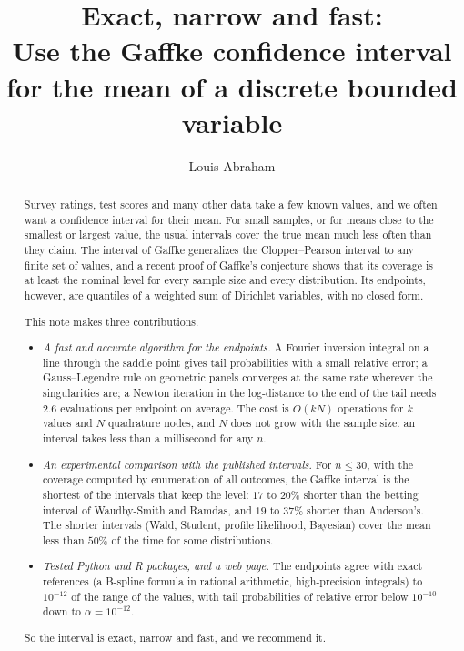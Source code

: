 \documentclass[11pt]{article}
\title{Exact, narrow and fast:\\ Use the Gaffke confidence interval\\ for the mean of a discrete bounded variable}
\author{Louis Abraham}
\date{}
\begin{document}
\maketitle

\begin{abstract}
Survey ratings, test scores and many other data take a few known values, and we often want a confidence interval for their mean.
For small samples, or for means close to the smallest or largest value, the usual intervals cover the true mean much less often than they claim.
The interval of Gaffke generalizes the Clopper--Pearson interval to any finite set of values, and a recent proof of Gaffke's conjecture shows that its coverage is at least the nominal level for every sample size and every distribution.
Its endpoints, however, are quantiles of a weighted sum of Dirichlet variables, with no closed form.

This note makes three contributions.
\begin{itemize}[nosep,leftmargin=1.5em]
  \item \emph{A fast and accurate algorithm for the endpoints.} A Fourier inversion integral on a line through the saddle point gives tail probabilities with a small relative error; a Gauss--Legendre rule on geometric panels converges at the same rate wherever the singularities are; a Newton iteration in the log-distance to the end of the tail needs $2.6$ evaluations per endpoint on average. The cost is $O(kN)$ operations for $k$ values and $N$ quadrature nodes, and $N$ does not grow with the sample size: an interval takes less than a millisecond for any $n$.
  \item \emph{An experimental comparison with the published intervals.} For $n \le 30$, with the coverage computed by enumeration of all outcomes, the Gaffke interval is the shortest of the intervals that keep the level: $17$ to $20\%$ shorter than the betting interval of Waudby-Smith and Ramdas, and $19$ to $37\%$ shorter than Anderson's. The shorter intervals (Wald, Student, profile likelihood, Bayesian) cover the mean less than $50\%$ of the time for some distributions.
  \item \emph{Tested Python and R packages, and a web page.} The endpoints agree with exact references (a B-spline formula in rational arithmetic, high-precision integrals) to $10^{-12}$ of the range of the values, with tail probabilities of relative error below $10^{-10}$ down to $\alpha = 10^{-12}$.
\end{itemize}
So the interval is exact, narrow and fast, and we recommend it.
\end{abstract}
\end{document}
